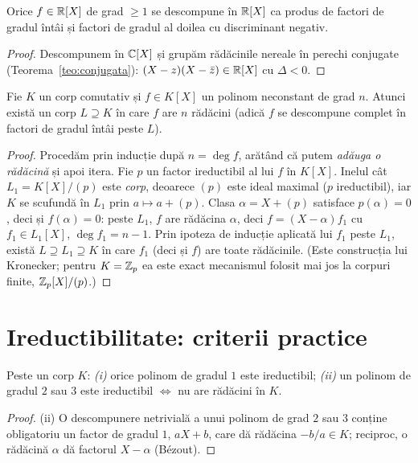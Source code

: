 \begin{corolar}[{descompunerea în $\RR[X]$}]\label{cor:descR}
Orice $f\in\mathbb{R}[X]$ de grad $\ge1$ se descompune în $\RR[X]$ ca produs de factori de gradul întâi și factori de gradul al doilea cu discriminant negativ.
\end{corolar}

\begin{proof}
Descompunem în $\mathbb{C}[X]$ și grupăm rădăcinile nereale în perechi conjugate (Teorema~\ref{teo:conjugata}): $(X-z)(X-\bar z)\in\mathbb{R}[X]$ cu $\Delta<0$.
\end{proof}

\begin{teorema}\label{teo:corpdescompunere}
Fie $K$ un corp comutativ și $f\in K[X]$ un polinom neconstant de grad $n$. Atunci există un corp $L\supseteq K$ în care $f$ are $n$ rădăcini (adică $f$ se descompune complet în factori de gradul întâi peste $L$).
\end{teorema}
\begin{proof}
Procedăm prin inducție după $n=\deg f$, arătând că putem \emph{adăuga o rădăcină} și apoi itera. Fie $p$ un factor ireductibil al lui $f$ în $K[X]$. Inelul cât $L_1=K[X]/(p)$ este \emph{corp}, deoarece $(p)$ este ideal maximal ($p$ ireductibil), iar $K$ se scufundă în $L_1$ prin $a\mapsto a+(p)$. Clasa $\alpha=X+(p)$ satisface $p(\alpha)=0$, deci și $f(\alpha)=0$: peste $L_1$, $f$ are rădăcina $\alpha$, deci $f=(X-\alpha)f_1$ cu $f_1\in L_1[X]$, $\deg f_1=n-1$. Prin ipoteza de inducție aplicată lui $f_1$ peste $L_1$, există $L\supseteq L_1\supseteq K$ în care $f_1$ (deci și $f$) are toate rădăcinile. (Este construcția lui Kronecker; pentru $K=\mathbb{Z}_p$ ea este exact mecanismul folosit mai jos la corpuri finite, $\mathbb{Z}_p[X]/(p)$.)
\end{proof}

\section{Ireductibilitate: criterii practice}

\begin{propozitie}\label{prop:gradmic}
Peste un corp $K$: \emph{(i)} orice polinom de gradul $1$ este ireductibil; \emph{(ii)} un polinom de gradul $2$ sau $3$ este ireductibil $\iff$ nu are rădăcini în $K$.
\end{propozitie}

\begin{proof}
(ii) O descompunere netrivială a unui polinom de grad $2$ sau $3$ conține obligatoriu un factor de gradul $1$, $aX+b$, care dă rădăcina $-b/a\in K$; reciproc, o rădăcină $\alpha$ dă factorul $X-\alpha$ (Bézout).
\end{proof}

